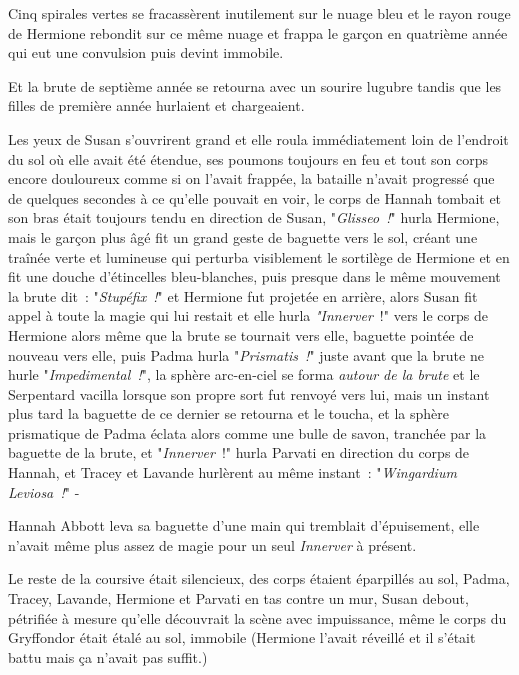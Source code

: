 Cinq spirales vertes se fracassèrent inutilement sur le nuage bleu et le rayon rouge de Hermione rebondit sur ce même nuage et frappa le garçon en quatrième année qui eut une convulsion puis devint immobile.

Et la brute de septième année se retourna avec un sourire lugubre tandis que les filles de première année hurlaient et chargeaient.

\later

Les yeux de Susan s'ouvrirent grand et elle roula immédiatement loin de l'endroit du sol où elle avait été étendue, ses poumons toujours en feu et tout son corps encore douloureux comme si on l'avait frappée, la bataille n'avait progressé que de quelques secondes à ce qu'elle pouvait en voir, le corps de Hannah tombait et son bras était toujours tendu en direction de Susan, "\emph{Glisseo~!}" hurla Hermione, mais le garçon plus âgé fit un grand geste de baguette vers le sol, créant une traînée verte et lumineuse qui perturba visiblement le sortilège de Hermione et en fit une douche d'étincelles bleu-blanches, puis presque dans le même mouvement la brute dit~: "\emph{Stupéfix~!}" et Hermione fut projetée en arrière, alors Susan fit appel à toute la magie qui lui restait et elle hurla \emph{"Innerver}~!" vers le corps de Hermione alors même que la brute se tournait vers elle, baguette pointée de nouveau vers elle, puis Padma hurla "\emph{Prismatis~!}" juste avant que la brute ne hurle "\emph{Impedimental~!}", la sphère arc-en-ciel se forma \emph{autour de la brute} et le Serpentard vacilla lorsque son propre sort fut renvoyé vers lui, mais un instant plus tard la baguette de ce dernier se retourna et le toucha, et la sphère prismatique de Padma éclata alors comme une bulle de savon, tranchée par la baguette de la brute, et "\emph{Innerver}~!" hurla Parvati en direction du corps de Hannah, et Tracey et Lavande hurlèrent au même instant~: "\emph{Wingardium Leviosa~!}" -

\later

Hannah Abbott leva sa baguette d'une main qui tremblait d'épuisement, elle n'avait même plus assez de magie pour un seul \emph{Innerver} à présent.

Le reste de la coursive était silencieux, des corps étaient éparpillés au sol, Padma, Tracey, Lavande, Hermione et Parvati en tas contre un mur, Susan debout, pétrifiée à mesure qu'elle découvrait la scène avec impuissance, même le corps du Gryffondor était étalé au sol, immobile (Hermione l'avait réveillé et il s'était battu mais ça n'avait pas suffit.)

